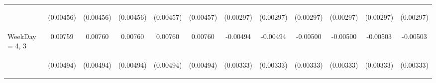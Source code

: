 \documentclass[]{article}
\begin{document}
\begin{center}
\begin{tabular}{lccccccccccc}
\vspace{4pt} & \begin{footnotesize}(0.00456)\end{footnotesize} & \begin{footnotesize}(0.00456)\end{footnotesize} & \begin{footnotesize}(0.00456)\end{footnotesize} & \begin{footnotesize}(0.00457)\end{footnotesize} & \begin{footnotesize}(0.00457)\end{footnotesize} & \begin{footnotesize}(0.00297)\end{footnotesize} & \begin{footnotesize}(0.00297)\end{footnotesize} & \begin{footnotesize}(0.00297)\end{footnotesize} & \begin{footnotesize}(0.00297)\end{footnotesize} & \begin{footnotesize}(0.00297)\end{footnotesize} & \begin{footnotesize}(0.00297)\end{footnotesize} \\
WeekDay = 4, 3 & 0.00759 & 0.00760 & 0.00760 & 0.00760 & 0.00760 & -0.00494 & -0.00494 & -0.00500 & -0.00500 & -0.00503 & -0.00503 \\
\vspace{4pt} & \begin{footnotesize}(0.00494)\end{footnotesize} & \begin{footnotesize}(0.00494)\end{footnotesize} & \begin{footnotesize}(0.00494)\end{footnotesize} & \begin{footnotesize}(0.00494)\end{footnotesize} & \begin{footnotesize}(0.00494)\end{footnotesize} & \begin{footnotesize}(0.00333)\end{footnotesize} & \begin{footnotesize}(0.00333)\end{footnotesize} & \begin{footnotesize}(0.00333)\end{footnotesize} & \begin{footnotesize}(0.00333)\end{footnotesize} & \begin{footnotesize}(0.00333)\end{footnotesize} & \begin{footnotesize}(0.00333)\end{footnotesize} \\

\end{tabular}
\end{center}
\end{document}
